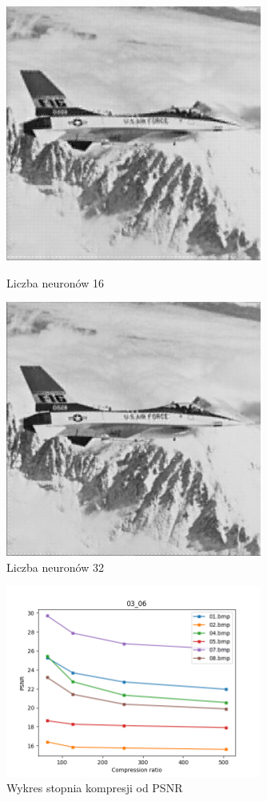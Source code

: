 \documentclass[../EDI_Task4_Karwowski_Kowalewski.tex]{subfiles}
\begin{document}
{    \begin{figure}[!htbp]
        \begin{minipage}[c]{0.49\linewidth}
            \centering
            \includegraphics[width=0.75\textwidth]{img/results_3/16/compressed_08.png}
            \caption{Liczba neuronów 16}
        \end{minipage}\hfill
        \begin{minipage}[c]{0.49\linewidth}
            \centering
            \includegraphics[width=0.75\textwidth]{img/results_3/32/compressed_08.png}
            \caption{Liczba neuronów 32}
        \end{minipage}
    \end{figure}

    \begin{figure}[!htbp]
        \centering
        \includegraphics[width=0.75\textwidth]{img/results_3/stats_03_06.png}
        \caption{Wykres stopnia kompresji od PSNR}
    \end{figure}
    \FloatBarrier
}
\end{document}
